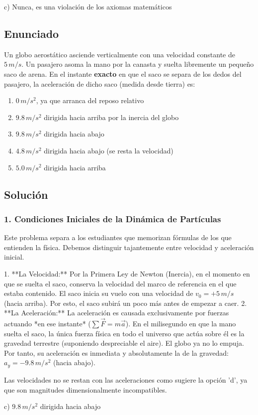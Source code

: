 \documentclass[12pt, a4paper]{article}
\begin{document}
\begin{tcolorbox}[colback=green!5!white, colframe=green!50!black, title=Respuesta Final]
\centering \Large c) Nunca, es una violación de los axiomas matemáticos
\end{tcolorbox}

\newpage

\subsection*{Enunciado}
Un globo aerostático asciende verticalmente con una velocidad constante de $5\,\si{m/s}$. Un pasajero asoma la mano por la canasta y suelta libremente un pequeño saco de arena. En el instante \textbf{exacto} en que el saco se separa de los dedos del pasajero, la aceleración de dicho saco (medida desde tierra) es:
\begin{enumerate}[label=\alph*)]
    \item $0\,\si{m/s^2}$, ya que arranca del reposo relativo
    \item $9.8\,\si{m/s^2}$ dirigida hacia arriba por la inercia del globo
    \item $9.8\,\si{m/s^2}$ dirigida hacia abajo
    \item $4.8\,\si{m/s^2}$ dirigida hacia abajo (se resta la velocidad)
    \item $5.0\,\si{m/s^2}$ dirigida hacia arriba
\end{enumerate}

\subsection*{Solución}

\subsubsection*{1. Condiciones Iniciales de la Dinámica de Partículas}
Este problema separa a los estudiantes que memorizan fórmulas de los que entienden la física. Debemos distinguir tajantemente entre velocidad y aceleración inicial.

1. **La Velocidad:** Por la Primera Ley de Newton (Inercia), en el momento en que se suelta el saco, conserva la velocidad del marco de referencia en el que estaba contenido. El saco inicia su vuelo con una velocidad de $v_0 = +5\,\si{m/s}$ (hacia arriba). Por esto, el saco subirá un poco más antes de empezar a caer.
2. **La Aceleración:** La aceleración es causada exclusivamente por fuerzas actuando *en ese instante* ($\sum \vec{F} = m\vec{a}$). En el milisegundo en que la mano suelta el saco, la única fuerza física en todo el universo que actúa sobre él es la gravedad terrestre (suponiendo despreciable el aire). El globo ya no lo empuja. Por tanto, su aceleración es inmediata y absolutamente la de la gravedad: $a_y = -9.8\,\si{m/s^2}$ (hacia abajo).

Las velocidades no se restan con las aceleraciones como sugiere la opción 'd', ya que son magnitudes dimensionalmente incompatibles.

\begin{tcolorbox}[colback=green!5!white, colframe=green!50!black, title=Respuesta Final]
\centering \Large c) $9.8\,\si{m/s^2}$ dirigida hacia abajo
\end{tcolorbox}
\end{document}
